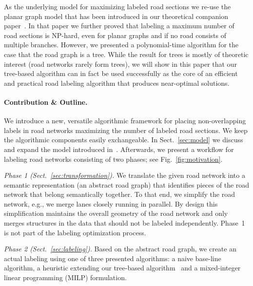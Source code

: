 \documentclass[a4paper,11pt]{article}
\begin{document}
As the underlying model for maximizing labeled road sections we re-use the planar graph model that has been introduced in our theoretical companion paper~\cite{rlTheory}. In that paper we further proved that labeling a maximum number of road sections is
NP-hard, even for planar graphs and if no road consists of multiple branches. However, we presented a polynomial-time algorithm for the case that the road graph
is a tree.  While the result for trees is mostly of theoretic
interest (road networks rarely form trees), we will show in this paper
that our tree-based algorithm can in fact be used successfully as the
core of an efficient and practical road labeling algorithm that
produces near-optimal solutions.




\paragraph{Contribution \& Outline.} We introduce a
new, versatile algorithmic framework for placing non-overlapping
labels in road networks maximizing the number of labeled road sections.  We
keep the algorithmic components easily exchangeable.  In
Sect.~\ref{sec:model} we discuss and expand the model introduced
in~\cite{rlTheory}. Afterwards, we present a workflow for labeling road networks consisting of two phases; see Fig.~\ref{fig:motivation}.

\textit{Phase 1 (Sect.~\ref{sec:transformation}).} We translate the
given road network into a semantic representation (an abstract road
graph) that identifies pieces of the road network that belong
semantically together. To that end, we simplify the road network,
e.g., we merge lanes closely running in parallel. By
  design this simplification maintains the overall geometry of the road
  network and only merges structures in the data that should not be labeled independently. Phase~1 is not part of the labeling optimization process.

\textit{Phase 2 (Sect.~\ref{sec:labeling}).} Based on
the abstract road graph, we create an actual labeling using one of three  presented
algorithms: a naive base-line algorithm, a heuristic
extending our tree-based algorithm~\cite{rlTheory} and a
 mixed-integer linear programming (MILP) formulation. 
\end{document}

